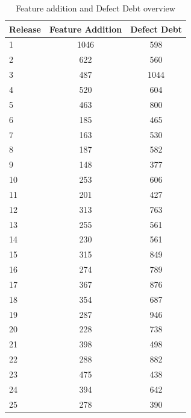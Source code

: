 \begin{table}[!hbt]
      \begin{center}
            \caption{Feature addition and Defect Debt overview}
            \label{tab:feature_addition_badsmell_overview}
            \begin{tabular}{l| c c }
            \toprule
            \textbf{Release}  & \textbf{Feature Addition} & \textbf{Defect Debt} \\ \midrule 
              1  & 1046 & 598   \\ 
              2  & 622 & 560    \\ 
              3  & 487 & 1044   \\ 
              4  & 520 & 604    \\ 
              5  & 463 & 800    \\ 
              6  & 185 & 465    \\ 
              7  & 163 & 530    \\ 
              8  & 187 & 582    \\ 
              9  & 148 & 377    \\ 
             10  & 253 & 606    \\ 
             11  & 201 & 427    \\ 
             12  & 313 & 763    \\ 
             13  & 255 & 561    \\ 
             14  & 230 & 561    \\ 
             15  & 315 & 849    \\ 
             16  & 274 & 789    \\ 
             17  & 367 & 876    \\ 
             18  & 354 & 687    \\ 
             19  & 287 & 946    \\ 
             20  & 228 & 738    \\ 
             21  & 398 & 498    \\ 
             22  & 288 & 882    \\ 
             23  & 475 & 438    \\ 
             24  & 394 & 642    \\ 
             25  & 278 & 390    \\ \bottomrule
            \end{tabular}
      \end{center}
\end{table}

